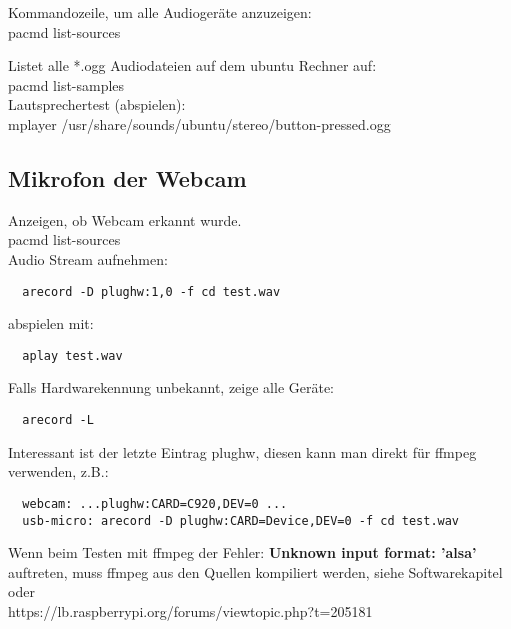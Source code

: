 Kommandozeile, um alle Audiogeräte anzuzeigen:\\
pacmd list-sources

Listet alle *.ogg Audiodateien auf dem ubuntu Rechner auf:\\
pacmd list-samples\\
Lautsprechertest (abspielen):\\
mplayer /usr/share/sounds/ubuntu/stereo/button-pressed.ogg 

\subsection{Mikrofon der Webcam}
Anzeigen, ob Webcam erkannt wurde.\\
pacmd list-sources\\ 

Audio Stream aufnehmen:
\begin{verbatim}
  arecord -D plughw:1,0 -f cd test.wav
\end{verbatim}
abspielen mit:
\begin{verbatim}
  aplay test.wav
\end{verbatim}

Falls Hardwarekennung unbekannt, zeige alle Geräte:
\begin{verbatim}
  arecord -L
\end{verbatim}
Interessant ist der letzte Eintrag plughw, diesen kann man direkt für
ffmpeg verwenden, z.B.:
\begin{verbatim}
  webcam: ...plughw:CARD=C920,DEV=0 ...
  usb-micro: arecord -D plughw:CARD=Device,DEV=0 -f cd test.wav
\end{verbatim}

Wenn beim Testen mit ffmpeg der Fehler: 
\textbf{Unknown input format: 'alsa'}\\ 
auftreten, muss ffmpeg aus den Quellen kompiliert werden, siehe 
Softwarekapitel oder\\ 
https://lb.raspberrypi.org/forums/viewtopic.php?t=205181

